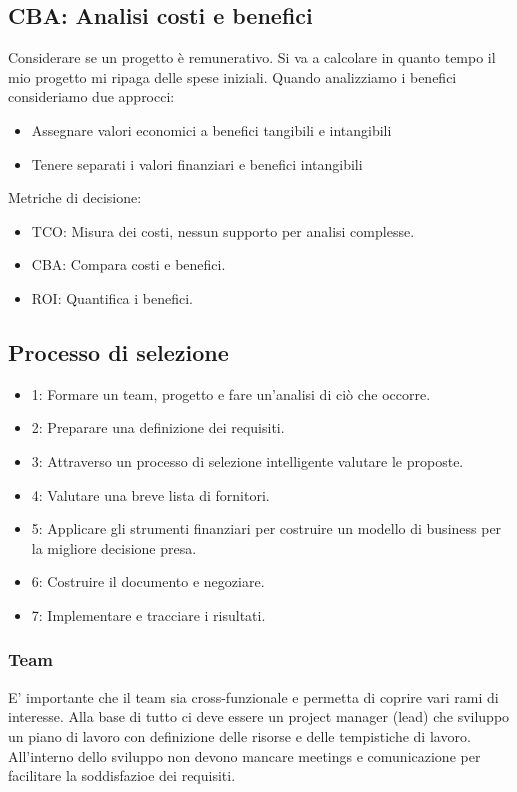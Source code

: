 \documentclass{article}
\begin{document}
		\subsection{CBA: Analisi costi e benefici}
		Considerare se un progetto è remunerativo. Si va a calcolare in quanto tempo il mio progetto mi ripaga delle spese iniziali. Quando analizziamo i benefici consideriamo due approcci:
		\begin{itemize}
		    \item Assegnare valori economici a benefici tangibili e intangibili
		    \item Tenere separati i valori finanziari e benefici intangibili
		\end{itemize}
		Metriche di decisione:
		\begin{itemize}
		    \item TCO: Misura dei costi, nessun supporto per analisi complesse.
		    \item CBA: Compara costi e benefici.
		    \item ROI: Quantifica i benefici.
		\end{itemize}
		\subsection{Processo di selezione}
		\begin{itemize}
		    \item 1: Formare un team, progetto e fare un'analisi di ciò che occorre.
		    \item 2: Preparare una definizione dei requisiti.
		    \item 3: Attraverso un processo di selezione intelligente valutare le proposte.
		    \item 4: Valutare una breve lista di fornitori.
		    \item 5: Applicare gli strumenti finanziari per costruire un modello di business per la migliore decisione presa.
		    \item 6: Costruire il documento e negoziare.
		    \item 7: Implementare e tracciare i risultati.
		\end{itemize}
		\subsubsection{Team}
		E' importante che il team sia cross-funzionale e permetta di coprire vari rami di interesse. Alla base di tutto ci deve essere un project manager (lead) che sviluppo un piano di lavoro con definizione delle risorse e delle tempistiche di lavoro. \\
		All'interno dello sviluppo non devono mancare meetings e comunicazione per facilitare la soddisfazioe dei requisiti.
\end{document}

